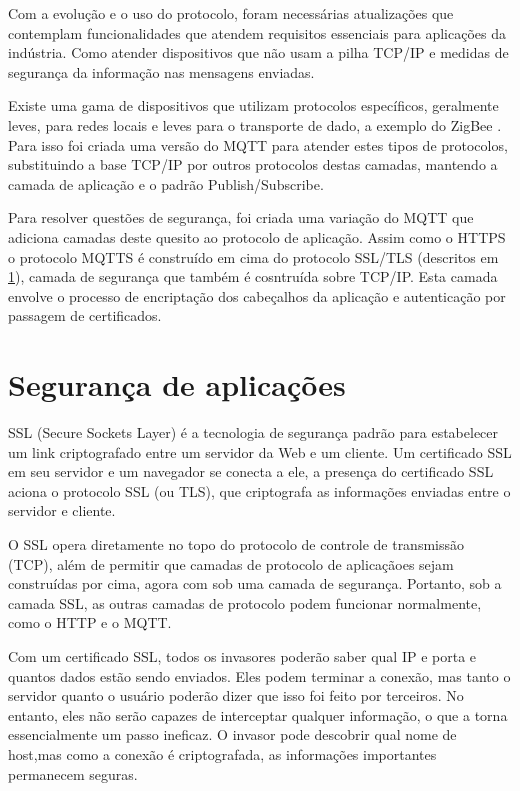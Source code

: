Com a evolução e o uso do protocolo, foram necessárias atualizações que contemplam funcionalidades que atendem  requisitos essenciais para aplicações da indústria. Como atender dispositivos que não usam a pilha TCP/IP e medidas de segurança da informação nas mensagens enviadas. 

Existe uma gama de dispositivos que utilizam protocolos específicos, geralmente leves, para redes locais e leves para o transporte de dado, a exemplo do ZigBee \cite{zigbee}. Para isso foi criada uma versão do MQTT para atender estes tipos de protocolos, substituindo a base TCP/IP por outros protocolos destas camadas, mantendo a camada de aplicação e o padrão Publish/Subscribe.

Para resolver questões de segurança, foi criada uma variação do MQTT que adiciona camadas deste quesito ao protocolo de aplicação. Assim como o HTTPS o protocolo MQTTS é construído em cima do protocolo SSL/TLS (descritos em \ref{section:seguranca}), camada de segurança que também é cosntruída sobre TCP/IP. Esta camada envolve o processo de encriptação dos cabeçalhos da aplicação e autenticação por passagem de certificados.

\section{Segurança de aplicações}
\label{section:seguranca}

SSL \cite{ssl} (Secure Sockets Layer) é a tecnologia de segurança padrão para estabelecer um link criptografado entre um servidor da Web e um cliente. Um certificado SSL em seu servidor e um navegador se conecta a ele, a presença do certificado SSL aciona o protocolo SSL (ou TLS), que criptografa as informações enviadas entre o servidor e cliente.

O SSL opera diretamente no topo do protocolo de controle de transmissão (TCP), além de permitir que camadas de protocolo de aplicaçãoes sejam construídas por cima, agora com sob uma camada de segurança. Portanto, sob a camada SSL, as outras camadas de protocolo podem funcionar normalmente, como o HTTP e o MQTT.

Com um certificado SSL, todos os invasores poderão saber qual IP e porta e quantos dados estão sendo enviados. Eles podem terminar a conexão, mas tanto o servidor quanto o usuário poderão dizer que isso foi feito por terceiros. No entanto, eles não serão capazes de interceptar qualquer informação, o que a torna essencialmente um passo ineficaz. O invasor pode descobrir qual nome de host,mas como a conexão é criptografada, as informações importantes permanecem seguras.


